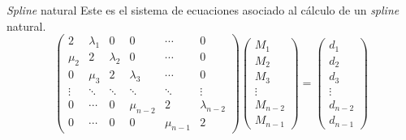 \begin{frame}{\textit{Spline} natural}
    Este es el sistema de ecuaciones asociado al cálculo
    de un \textit{spline} natural.
    \[
    \begin{pmatrix}
        2 & \lambda_1 & 0 & 0 & \cdots & 0\\
        \mu_2 & 2 & \lambda_2 & 0 & \cdots & 0\\
        0 & \mu_3 & 2 & \lambda_3 & \cdots & 0\\
        \vdots & \ddots& \ddots & \ddots & \ddots & \vdots\\
        0 & \cdots & 0 & \mu_{n-2} & 2 & \lambda_{n-2}\\
        0 & \cdots & 0 & 0 & \mu_{n-1} & 2 
    \end{pmatrix}
    \begin{pmatrix}
        M_1 \\ M_2 \\ M_3 \\ \vdots \\ M_{n-2} \\ M_{n-1}
    \end{pmatrix}
    =
    \begin{pmatrix}
        d_1 \\ d_2 \\ d_3 \\ \vdots \\ d_{n-2} \\ d_{n-1}
    \end{pmatrix}
    \]
\end{frame}

